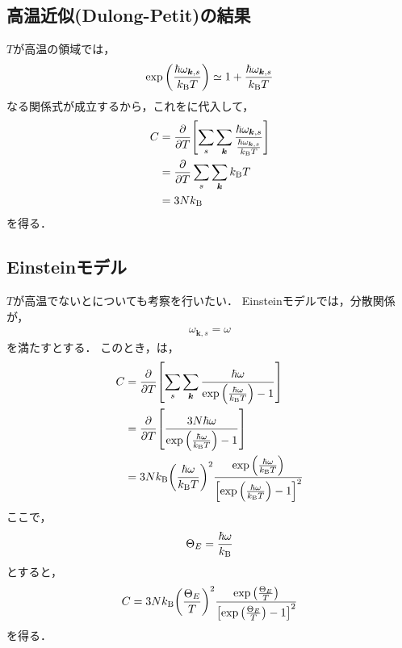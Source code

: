 \documentclass{report}
\begin{document}
      \subsection{高温近似(Dulong-Petit)の結果}
        $T$が高温の領域では，
        \begin{align}
          \exp\qty(\frac{\hbar\omega_{\bm{k}, s}}{k_{\mathrm{B}} T}) \simeq 1 + \frac{\hbar\omega_{\bm{k}, s}}{k_{\mathrm{B}} T}
        \end{align}
        なる関係式が成立するから，これをに代入して，
        \begin{align}
          C &= \pdv{T}\qty[\sum_s\sum_{\bm{k}}\frac{\hbar\omega_{\bm{k}, s}}{\frac{\hbar\omega_{\bm{k}, s}}{k_{\mathrm{B}} T}}] \\ 
          &= \pdv{T}\sum_s\sum_{\bm{k}}k_{\mathrm{B}} T \\ 
          &= 3Nk_{\mathrm{B}}
        \end{align}
        を得る．
      \subsection{Einsteinモデル}
        $T$が高温でないとについても考察を行いたい．
        Einsteinモデルでは，分散関係が，
        \begin{align}
          \omega_{\bm{k}, s} = \omega
        \end{align}
        を満たすとする．
        このとき，は，
        \begin{align}
          C &= \pdv{T}\qty[\sum_s\sum_{\bm{k}}\frac{\hbar\omega}{\exp\qty(\frac{\hbar\omega}{k_{\mathrm{B}} T}) - 1}] \\ 
          &= \pdv{T}\qty[\frac{3N\hbar\omega}{\exp\qty(\frac{\hbar\omega}{k_{\mathrm{B}} T}) - 1}] \\
          &= 3Nk_{\mathrm{B}}\qty(\frac{\hbar\omega}{k_{\mathrm{B}} T})^2\frac{\exp\qty(\frac{\hbar\omega}{k_{\mathrm{B}} T})}{\qty[\exp\qty(\frac{\hbar\omega}{k_{\mathrm{B}} T}) - 1]^2} 
        \end{align}
        ここで，
        \begin{align}
          \Theta_E = \frac{\hbar\omega}{k_{\mathrm{B}}}
        \end{align}
        とすると，
        \begin{align}
          C = 3Nk_{\mathrm{B}}\qty(\frac{\Theta_E}{T})^2\frac{\exp\qty(\frac{\Theta_E}{T})}{\qty[\exp\qty(\frac{\Theta_E}{T}) - 1]^2}
        \end{align}
        を得る．
\end{document}

